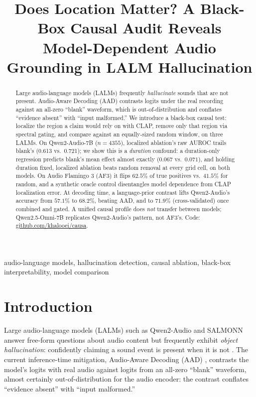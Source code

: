 \documentclass{article}
\title{Does Location Matter? A Black-Box Causal Audit Reveals\\
Model-Dependent Audio Grounding in LALM Hallucination}
\begin{document}
\ninept
\setlength{\textfloatsep}{4pt plus 1pt minus 2pt}
\setlength{\floatsep}{3pt plus 1pt minus 1pt}
\setlength{\intextsep}{4pt plus 1pt minus 2pt}
\setlength{\abovecaptionskip}{2pt}
\setlength{\belowcaptionskip}{1pt}
\renewcommand{\arraystretch}{0.8}
\maketitle

\begin{abstract}
Large audio-language models (LALMs) frequently \emph{hallucinate}
sounds that are not present. Audio-Aware Decoding (AAD)
\cite{hsu2025aad} contrasts logits under the real recording against an
all-zero ``blank'' waveform, which is out-of-distribution and conflates
``evidence absent'' with ``input malformed.'' We introduce a black-box
causal test: localize the region a claim would rely on with CLAP,
remove only that region via spectral gating, and compare against an
equally-sized random window, on three LALMs. On Qwen2-Audio-7B
($n{=}4355$), localized ablation's raw AUROC trails blank's (0.613 vs.\
0.721); we show this is a \emph{duration} confound: a duration-only
regression predicts blank's mean effect almost exactly ($0.067$ vs.\
$0.071$), and holding duration fixed, localized ablation beats random
removal at every grid cell, on both models. On Audio Flamingo 3 (AF3)
it flips $62.5\%$ of true positives vs.\ $41.5\%$ for random, and a
synthetic oracle control disentangles model dependence from CLAP
localization error. At decoding time, a language-prior contrast lifts
Qwen2-Audio's accuracy from $57.1\%$ to $68.2\%$, beating AAD, and to
$71.9\%$ (cross-validated) once combined and gated. A unified causal
profile does \emph{not} transfer between models; Qwen2.5-Omni-7B
replicates Qwen2-Audio's pattern, not AF3's. Code:
\url{github.com/khalooei/causa}.
\end{abstract}

\begin{keywords}
audio-language models, hallucination detection, causal ablation, black-box interpretability, model comparison
\end{keywords}

\section{Introduction}

Large audio-language models (LALMs) such as Qwen2-Audio
\cite{chu2023qwen2audio} and SALMONN \cite{tang2024salmonn} answer free-form questions about
audio content but frequently exhibit \emph{object hallucination}:
confidently claiming a sound event is present when it is not
\cite{kuan2024understanding,kuan2025can}. The current inference-time
mitigation, Audio-Aware Decoding (AAD) \cite{hsu2025aad}, contrasts the
model's logits with real audio against logits from an all-zero
``blank'' waveform, almost certainly out-of-distribution for the
audio encoder: the contrast conflates ``evidence absent'' with ``input
malformed.''
\end{document}
